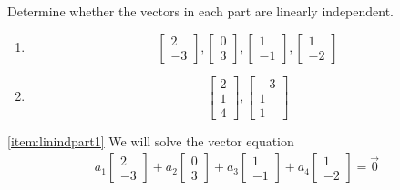 \documentclass{ximera}
\begin{document}

\begin{example}\label{ex:linind}Determine whether the vectors in each part are linearly independent.

\begin{enumerate}
\item \label{item:linindpart1}
$$\begin{bmatrix}2\\-3\end{bmatrix}, \begin{bmatrix}0\\3\end{bmatrix},\begin{bmatrix}1\\-1\end{bmatrix},\begin{bmatrix}1\\-2\end{bmatrix}$$

\item \label{item:linindpart2} $$\begin{bmatrix}2\\1\\4\end{bmatrix},\begin{bmatrix}-3\\1\\1\end{bmatrix}$$
\end{enumerate}
\begin{explanation} \ref{item:linindpart1}
We will solve the vector equation
\begin{align}\label{eq:linrelationpart1}a_1\begin{bmatrix}2\\-3\end{bmatrix}+a_2 \begin{bmatrix}0\\3\end{bmatrix}+a_3\begin{bmatrix}1\\-1\end{bmatrix}+a_4\begin{bmatrix}1\\-2\end{bmatrix}=\vec{0}\end{align}
 

\end{explanation}
\end{example}
\end{document}
